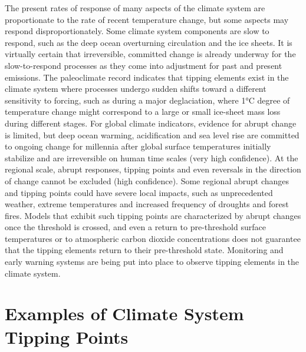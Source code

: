The present rates of response of many aspects of the climate system are proportionate to the rate of recent temperature change, but some aspects may respond disproportionately. Some climate system components are slow to respond, such as the deep ocean overturning circulation and the ice sheets. It is virtually certain that irreversible, committed change is already underway for the slow-to-respond processes as they come into adjustment for past and present emissions. The paleoclimate record indicates that tipping elements exist in the climate system where processes undergo sudden shifts toward a different sensitivity to forcing, such as during a major deglaciation, where 1°C degree of temperature change might correspond to a large or small ice-sheet mass loss during different stages. For global climate indicators, evidence for abrupt change is limited, but deep ocean warming, acidification and sea level rise are committed to ongoing change for millennia after global surface temperatures initially stabilize and are irreversible on human time scales (very high confidence). At the regional scale, abrupt responses, tipping points and even reversals in the direction of change cannot be excluded (high confidence). Some regional abrupt changes and tipping points could have severe local impacts, such as unprecedented weather, extreme temperatures and increased frequency of droughts and forest fires. Models that exhibit such tipping points are characterized by abrupt changes once the threshold is crossed, and even a return to pre-threshold surface temperatures or to atmospheric carbon dioxide concentrations does not guarantee that the tipping elements return to their pre-threshold state. Monitoring and early warning systems are being put into place to observe tipping elements in the climate system. 






\section{Examples of Climate System Tipping Points}

